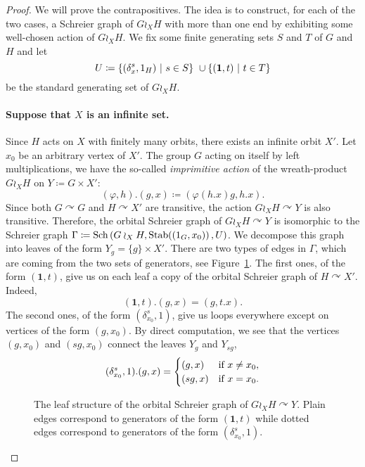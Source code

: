 \begin{proof}
We will prove the contrapositives. The idea is to construct, for each of the two cases, a Schreier graph of $G\wr_XH$ with more than one end by exhibiting some well-chosen action of $G\wr_XH$.
We fix some finite generating sets $S$ and $T$ of $G$ and $H$ and let
\[
	U\coloneqq\setst{(\delta_x^s,1_H)}{s \in S} \cup \setst{(\mathbf 1,t)}{t \in T}
\]
be the standard generating set of $G\wr_XH$.
%
%
%
\paragraph{Suppose that $X$ is an infinite set.}
Since $H$ acts on $X$ with finitely many orbits, there exists an infinite orbit $X'$.
Let $x_0$ be an arbitrary vertex of $X'$.
The group $G$ acting on itself by left multiplications, we have the so-called \emph{imprimitive action} of the wreath-product $G\wr_XH$ on $Y\coloneqq G\times X'$:
\[
	(\varphi,h). (g,x) \coloneqq (\varphi(h.x)g, h.x).
\]
Since both $G\curvearrowright G$ and $H\curvearrowright X'$ are transitive, the action $G\wr_XH\curvearrowright Y$ is also transitive.
Therefore, the orbital Schreier graph of $G\wr_XH\curvearrowright Y$ is isomorphic to the Schreier graph $\Gamma\coloneqq\operatorname{Sch}\left(G\wr_XH, \operatorname{Stab}((1_G,x_0)\right), U)$. We decompose this graph into leaves of the form $Y_g = \{ g \} \times X'$. There are two types of edges in $\Gamma$, which are coming from the two sets of generators, see Figure~\ref{Figure:Leaves}. The first ones, of the form $(\mathbf 1,t)$, give us on each leaf a copy of the orbital Schreier graph of $H \curvearrowright X'$. Indeed,
\[
	(\mathbf 1,t).(g,x) = (g, t.x).
\]
The second ones, of the form $(\delta_{x_0}^s,1)$, give us loops everywhere except on vertices of the form $(g,x_0)$. By direct computation, we see that the vertices $(g,x_0)$ and $(sg,x_0)$ connect the leaves $Y_g$ and $Y_{sg}$,
\[
	(\delta_{x_0}^s,1).(g,x) =
		\begin{cases}
		(g,x) & \textnormal{if }x \neq x_0, \\
		(sg, x) & \textnormal{if }x = x_0.
		\end{cases}
\]
%
%
\begin{figure}[htbp]\centering
\scalebox{0.85}{
}
\caption{The leaf structure of the orbital Schreier graph of $G\wr_XH \curvearrowright Y$. Plain edges correspond to generators of the form $(\mathbf 1,t)$ while dotted edges correspond to generators of the form $(\delta_{x_0}^s,1)$.}
\label{Figure:Leaves}
\end{figure}
%
%


\end{proof}
